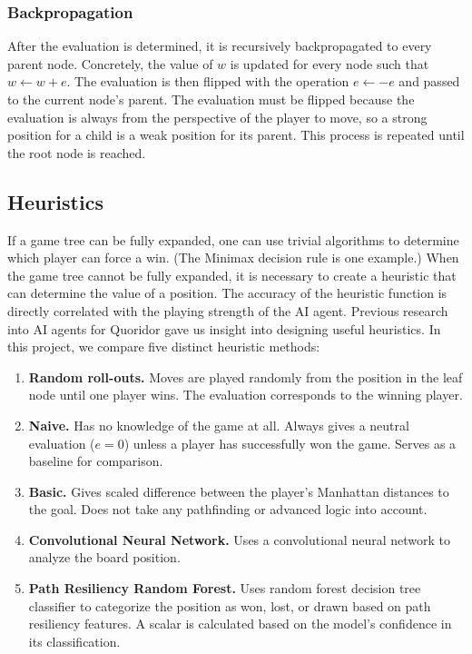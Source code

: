 \documentclass[10pt]{article}
\begin{document}
\subsubsection{Backpropagation}

After the evaluation is determined, it is recursively backpropagated to every parent node. Concretely, the value of $w$ is updated for every node such that $w \gets w + e$. The evaluation is then flipped with the operation $e \gets -e$ and passed to the current node's parent. The evaluation must be flipped because the evaluation is always from the perspective of the player to move, so a strong position for a child is a weak position for its parent. This process is repeated until the root node is reached.

\subsection{Heuristics}

If a game tree can be fully expanded, one can use trivial algorithms to determine which player can force a win. (The Minimax decision rule is one example.\cite{russell2020aima}) When the game tree cannot be fully expanded, it is necessary to create a heuristic that can determine the value of a position. The accuracy of the heuristic function is directly correlated with the playing strength of the AI agent. Previous research into AI agents for Quoridor gave us insight into designing useful heuristics. \cite{brown2018quoridor} In this project, we compare five distinct heuristic methods:

\begin{enumerate}
    \item \textbf{Random roll-outs.} Moves are played randomly from the position in the leaf node until one player wins. The evaluation corresponds to the winning player.
    \item \textbf{Naive.} Has no knowledge of the game at all. Always gives a neutral evaluation ($e = 0$) unless a player has successfully won the game. Serves as a baseline for comparison.
    \item \textbf{Basic.} Gives scaled difference between the player's Manhattan distances to the goal. Does not take any pathfinding or advanced logic into account.
    \item \textbf{Convolutional Neural Network.} Uses a convolutional neural network to analyze the board position.
    \item \textbf{Path Resiliency Random Forest.} Uses random forest decision tree classifier to categorize the position as won, lost, or drawn based on path resiliency features. A scalar is calculated based on the model's confidence in its classification.
\end{enumerate}
\end{document}
